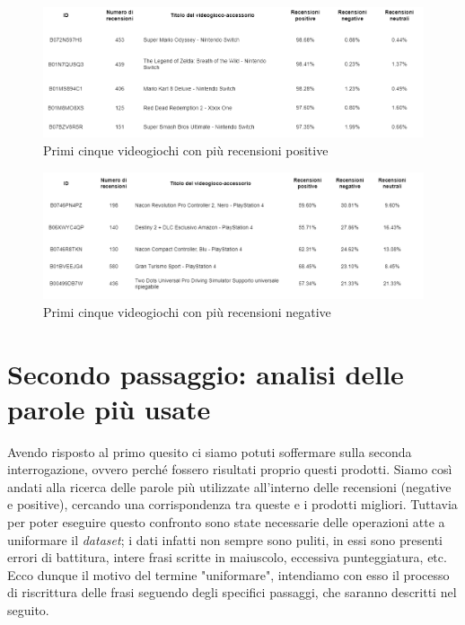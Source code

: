 		\begin{figure} [h]
			\includegraphics[width=\textwidth]{Figure/top_pos_videogames_table}
			\caption{Primi cinque videogiochi con più recensioni positive}
			\label{fig:top_pos_videogames_table}
		\end{figure}
		
		\begin{figure} [h]
			\includegraphics[width=\textwidth]{Figure/top_neg_videogames_table}
			\caption{Primi cinque videogiochi con più recensioni negative}
			\label{fig:top_neg_videogames_table}
		\end{figure}
		
	
	\section{Secondo passaggio: analisi delle parole più usate}
		Avendo risposto al primo quesito ci siamo potuti soffermare sulla seconda interrogazione, ovvero perché fossero risultati proprio questi prodotti. Siamo così andati alla ricerca delle parole più utilizzate all'interno delle recensioni (negative e positive), cercando una corrispondenza tra queste e i prodotti migliori. Tuttavia per poter eseguire questo confronto sono state necessarie delle operazioni atte a uniformare il \textit{dataset}; i dati infatti non sempre sono puliti, in essi sono presenti errori di battitura, intere frasi scritte in maiuscolo, eccessiva punteggiatura, etc. Ecco dunque il motivo del termine "uniformare", intendiamo con esso il processo di riscrittura delle frasi seguendo degli specifici passaggi, che saranno descritti nel seguito.
			
